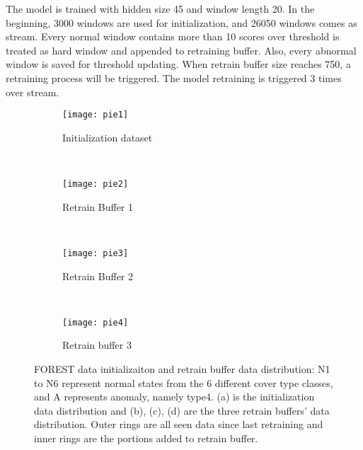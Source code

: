 The model is trained with hidden size 45 and window length 20. In the beginning, 3000 windows are used for initialization, and 26050 windows comes as stream.  Every normal window contains more than 10 scores over threshold is treated as hard window and appended to retraining buffer. Also, every abnormal window is saved for threshold updating.  When retrain buffer size reaches 750, a retraining process will be triggered. The model retraining is triggered 3 times over stream. 

\begin{figure}[h]
\centering
	\begin {subfigure}[t]{0.45\textwidth}
	\centering
	\texttt{[image: pie1]}
	\caption{Initialization dataset}
	\label{fig:init}
	\end{subfigure}
	~
	\begin {subfigure}[t]{0.45\textwidth}
	\centering
	\texttt{[image: pie2]}
	\caption{Retrain Buffer 1}
	\label{fig:buf1}
	\end{subfigure}
	~
	\begin {subfigure}[t]{0.45\textwidth}
	\centering
	\texttt{[image: pie3]}
	\caption{Retrain Buffer 2}
	\label{fig:buf2}
	\end{subfigure}
	~
	\begin {subfigure}[t]{0.45\textwidth}
	\centering
	\texttt{[image: pie4]}
	\caption{Retrain buffer 3}
	\label{fig:buf3}
	\end{subfigure}

	\caption[FOREST data initializaiton and retrain buffer data distribution]{FOREST data initializaiton and retrain buffer data distribution: N1 to N6 represent normal states from the 6 different cover type classes, and A represents anomaly, namely type4. (a) is the initialization data distribution and (b), (c), (d) are the three retrain buffers' data distribution. Outer rings are all seen data since last retraining and inner rings are the portions added to retrain buffer.}
\label{fig:bufs}
\end{figure}








